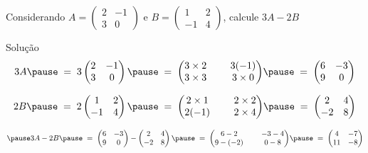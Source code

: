 \begin{question}
Considerando
\(
  A =
  \begin{pmatrix}
    2 & -1 \\
    3 & 0
  \end{pmatrix}
\)
\; e \;
\(
  B =
  \begin{pmatrix}
    1  & 2 \\
    -1 & 4
  \end{pmatrix}
\), \;
calcule
\(
  3A-2B
\)
\end{question}

\begin{resolution}{Solução}
\[
  3A
  \pause
  \;=\;
  3 \begin{pmatrix}
    2 & -1 \\
    3 & 0
  \end{pmatrix}
  \pause
  \;=\;
  {\setlength{\arraycolsep}{12pt}
  \begin{pmatrix}
    3 \times 2 & 3(-1) \\
    3 \times 3 & 3 \times 0
  \end{pmatrix}}
  \pause
  \;=\;
  \begin{pmatrix}
    6 & -3 \\
    9 & 0
  \end{pmatrix}
\]

\pause
\smallskip
\[
  2B
  \pause
  \;=\;
  2 \begin{pmatrix}
    1  & 2 \\
    -1 & 4
  \end{pmatrix}
  \pause
  \;=\;
  {\setlength{\arraycolsep}{12pt}
  \begin{pmatrix}
    2 \times 1 & 2 \times 2 \\
    2(-1)      & 2 \times 4
  \end{pmatrix}}
  \pause
  \;=\;
  \begin{pmatrix}
    2  & 4 \\
    -2 & 8
  \end{pmatrix}
\]

\[
  \pause
  3A-2B
  \pause
  \;=\;
  \begin{pmatrix}
    6 & -3 \\
    9 & 0
  \end{pmatrix}
  -
  \begin{pmatrix}
    2  & 4 \\
    -2 & 8
  \end{pmatrix}
  \pause
  \;=\;
  {\setlength{\arraycolsep}{12pt}
  \begin{pmatrix}
    6-2    & -3-4 \\
    9-(-2) & 0-8
  \end{pmatrix}}
  \pause
  \;=\;
  \begin{pmatrix}
    4  & -7 \\
    11 & -8
  \end{pmatrix}
\]

\end{resolution}

